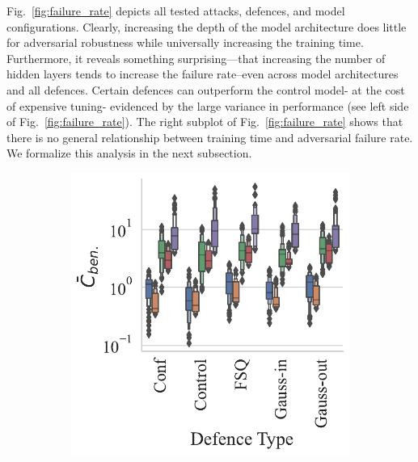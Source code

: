 Fig.~\ref{fig:failure_rate} depicts all tested attacks, defences, and model configurations. Clearly, increasing the depth of the model architecture does little for adversarial robustness while universally increasing the training time. Furthermore, it reveals something surprising---that increasing the number of hidden layers tends to increase the failure rate--even across model architectures and all defences. Certain defences can outperform the control model- at the cost of expensive tuning- evidenced by the large variance in performance (see left side of Fig.~\ref{fig:failure_rate}). The right subplot of Fig.~\ref{fig:failure_rate} shows that there is no general relationship between training time and adversarial failure rate. We formalize this analysis  in the next subsection.


\begin{figure}
    \centering
    \begin{subfigure}{.28\textwidth}
        \centering
        \includegraphics[width=\textwidth]{cifar/ben_failures_per_train_time_vs_defence_type.pdf}
    \end{subfigure}
    \begin{subfigure}{0.28\textwidth}

\end{subfigure}
\end{figure}
